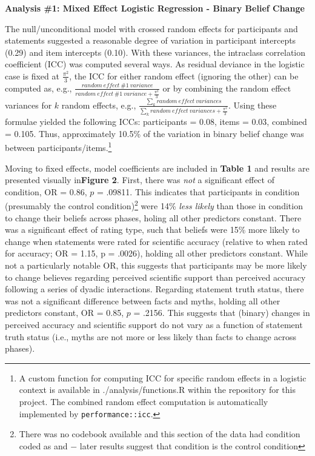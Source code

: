 \documentclass[12pt]{article}  %
\begin{document}
\noindent\textbf{Analysis \#1: Mixed Effect Logistic Regression - Binary Belief Change}

The null/unconditional model with crossed random effects for participants and statements suggested a reasonable degree of variation in participant intercepts (0.29) and item intercepts (0.10). With these variances, the intraclass correlation coefficient (ICC) was computed several ways. As residual deviance in the logistic case is fixed at $\frac{\pi^{2}}{3}$, the ICC for either random effect (ignoring the other) can be computed as, e.g., $\frac{random\:effect\:\#1\:variance}{random\:effect\:\#1\:variance + \frac{\pi^{2}}{3}}$ or by combining the random effect variances for $k$ random effects, e.g., $\frac{\sum\limits_{k} random\:effect\:variances}{\sum\limits_{k} random\:effect\:variances + \frac{\pi^{2}}{3}}$. Using these formulae yielded the following ICCs: participants = 0.08, items = 0.03, combined = 0.105. Thus, approximately 10.5\% of the variation in binary belief change was between participants/items.\footnote{A custom function for computing ICC for specific random effects in a logistic context is available in ./analysis/functions.R within the repository for this project. The combined random effect computation is automatically implemented by \verb|performance::icc|.}

Moving to fixed effects, model coefficients are included in \textbf{Table 1} and results are presented visually in\textbf{Figure 2}. First, there was \textit{not} a significant effect of condition, OR = 0.86, $p$ = .09811. This indicates that participants in condition  (presumably the control condition)\footnote{There was no codebook available and this section of the data had condition coded as  and  $-$ later results suggest that condition  is the control condition} were 14\% \textit{less likely} than those in condition  to change their beliefs across phases, holing all other predictors constant. There was a significant effect of rating type, such that beliefs were 15\% more likely to change when statements were rated for scientific accuracy (relative to when rated for accuracy; OR = 1.15, p = .0026), holding all other predictors constant. While not a particularly notable OR, this suggests that participants may be more likely to change believes regarding perceived scientific support than perceived accuracy following a series of dyadic interactions. Regarding statement truth status, there was not a significant difference between facts and myths, holding all other predictors constant, OR = 0.85, $p$ = .2156. This suggests that (binary) changes in perceived accuracy and scientific support do not vary as a function of statement truth status (i.e., myths are not more or less likely than facts to change across phases). 
\end{document}
